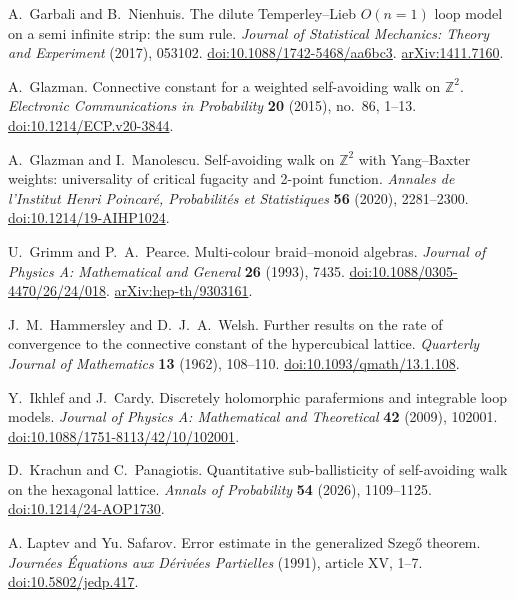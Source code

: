 A.~Garbali and B.~Nienhuis.
The dilute Temperley--Lieb $O(n=1)$ loop model on a semi infinite strip:
the sum rule.
\emph{Journal of Statistical Mechanics: Theory and Experiment} (2017), 053102.
\href{https://doi.org/10.1088/1742-5468/aa6bc3}{doi:10.1088/1742-5468/aa6bc3}.
\href{https://arxiv.org/abs/1411.7160}{arXiv:1411.7160}.

A.~Glazman.
Connective constant for a weighted self-avoiding walk on $\mathbb Z^2$.
\emph{Electronic Communications in Probability} \textbf{20} (2015), no.~86, 1--13.
\href{https://doi.org/10.1214/ECP.v20-3844}{doi:10.1214/ECP.v20-3844}.

A.~Glazman and I.~Manolescu.
Self-avoiding walk on $\mathbb Z^2$ with Yang--Baxter weights:
universality of critical fugacity and 2-point function.
\emph{Annales de l'Institut Henri Poincar\'e, Probabilit\'es et Statistiques}
\textbf{56} (2020), 2281--2300.
\href{https://doi.org/10.1214/19-AIHP1024}{doi:10.1214/19-AIHP1024}.

U.~Grimm and P.~A.~Pearce.
Multi-colour braid--monoid algebras.
\emph{Journal of Physics A: Mathematical and General} \textbf{26} (1993), 7435.
\href{https://doi.org/10.1088/0305-4470/26/24/018}{doi:10.1088/0305-4470/26/24/018}.
\href{https://arxiv.org/abs/hep-th/9303161}{arXiv:hep-th/9303161}.

J.~M.~Hammersley and D.~J.~A.~Welsh.
Further results on the rate of convergence to the connective constant of
the hypercubical lattice.
\emph{Quarterly Journal of Mathematics} \textbf{13} (1962), 108--110.
\href{https://doi.org/10.1093/qmath/13.1.108}{doi:10.1093/qmath/13.1.108}.

Y.~Ikhlef and J.~Cardy.
Discretely holomorphic parafermions and integrable loop models.
\emph{Journal of Physics A: Mathematical and Theoretical} \textbf{42} (2009), 102001.
\href{https://doi.org/10.1088/1751-8113/42/10/102001}{doi:10.1088/1751-8113/42/10/102001}.

D.~Krachun and C.~Panagiotis.
Quantitative sub-ballisticity of self-avoiding walk on the hexagonal lattice.
\emph{Annals of Probability} \textbf{54} (2026), 1109--1125.
\href{https://doi.org/10.1214/24-AOP1730}{doi:10.1214/24-AOP1730}.

A. Laptev and Yu. Safarov.
Error estimate in the generalized Szeg\H{o} theorem.
\emph{Journ\'ees \'Equations aux D\'eriv\'ees Partielles}
(1991), article XV, 1--7.
\href{https://doi.org/10.5802/jedp.417}{doi:10.5802/jedp.417}.

